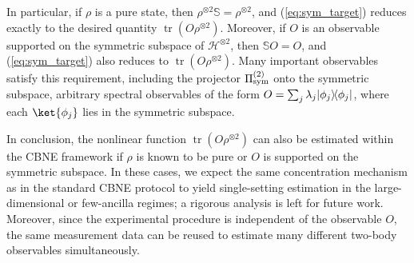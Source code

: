 \documentclass[aps,prl,twocolumn,nofootinbib,superscriptaddress,10pt]{revtex4-2}
\let\originalleft\left
\let\originalright\right
\renewcommand{\left}{\mathopen{}\mathclose\bgroup\originalleft}
\renewcommand{\right}{\aftergroup\egroup\originalright}
\newcommand{\ketbra}[2]{\ensuremath{\left|#1\right\rangle\!\left\langle#2\right|}}
\DeclareMathOperator{\Tr}{tr}
\theoremstyle{plain}
\theoremstyle{definition}
\newcommand{\caH}{\mathcal{H}}
\def\eqref#1{\textup{(\ref{#1})}}
\begin{document}
In particular, if $\rho$ is a pure state, then $\rho^{\otimes 2}\mathbb{S}= \rho^{\otimes 2}$, and \eqref{eq:sym_target} reduces exactly to the desired quantity $\Tr(O\rho^{\otimes 2})$. 
Moreover, if $O$ is an observable supported on the symmetric subspace of $\caH^{\otimes 2}$, then
$\mathbb{S}O=O$, 
and \eqref{eq:sym_target} also reduces to $\Tr(O\rho^{\otimes 2})$. Many important observables satisfy this requirement, including 
the projector $\Pi_{\rm sym}^{(2)}$ onto the symmetric subspace, arbitrary spectral observables of the form
$O=\sum_j \lambda_j \ketbra{\phi_j}{\phi_j}$, 
where each $\ket{\phi_j}$ lies in the symmetric subspace. 


In conclusion, the nonlinear function $\Tr(O\rho^{\otimes 2})$ can also be estimated within the CBNE framework if $\rho$ is known to be pure or $O$ is supported on the symmetric subspace.  
In these cases, we expect the same concentration mechanism as in the standard CBNE protocol to yield single-setting estimation in the large-dimensional or few-ancilla regimes; a rigorous analysis is left for future work.
Moreover, since the experimental procedure is independent of the observable $O$, the same measurement data can be reused to estimate many different two-body observables simultaneously. 
\end{document}

